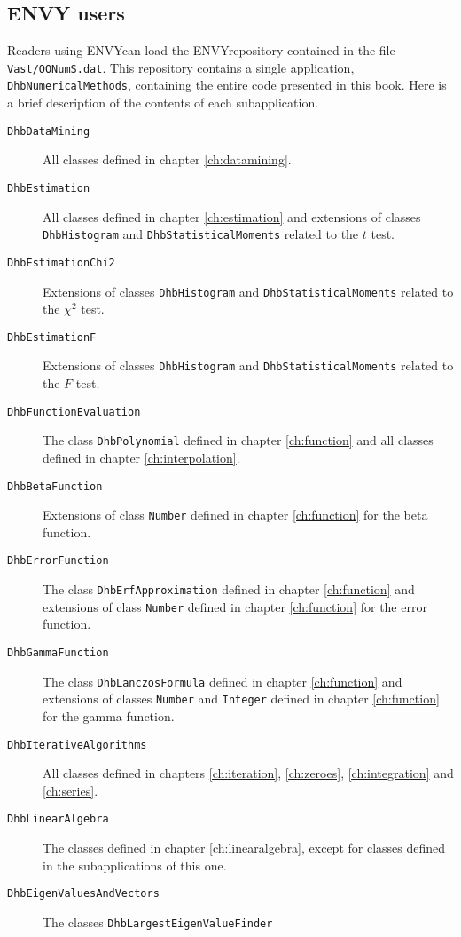 \documentclass[twoside]{book}
\begin{document}
\subsection{ENVY users}
Readers using ENVY\tm can load the ENVY\tm repository contained in
the file {\tt Vast/OONumS.dat}. This repository contains a single
application, {\tt DhbNumericalMethods}, containing the entire code
presented in this book. Here is a brief description of the
contents of each subapplication.
\begin{description}
  \item[\tt DhbDataMining] All classes defined in chapter \ref{ch:datamining}.
  \item[\tt DhbEstimation] All classes defined in chapter \ref{ch:estimation} and
     extensions of classes {\tt DhbHistogram} and
     {\tt DhbStatisticalMoments} related to the $t$ test.
  \item[\tt DhbEstimationChi2] Extensions of classes {\tt DhbHistogram} and
     {\tt DhbStatisticalMoments} related to the $\chi^2$ test.
  \item[\tt DhbEstimationF] Extensions of classes {\tt DhbHistogram} and
     {\tt DhbStatisticalMoments} related to the $F$ test.
  \item[\tt DhbFunctionEvaluation] The class {\tt DhbPolynomial} defined
     in chapter \ref{ch:function} and all classes defined in chapter \ref{ch:interpolation}.
  \item[\tt DhbBetaFunction] Extensions of class {\tt Number} defined
     in chapter \ref{ch:function} for the beta function.
  \item[\tt DhbErrorFunction] The class {\tt DhbErfApproximation} defined
     in chapter \ref{ch:function} and extensions of class {\tt Number} defined
     in chapter \ref{ch:function} for the error function.
  \item[\tt DhbGammaFunction] The class {\tt DhbLanczosFormula} defined
     in chapter \ref{ch:function} and extensions of classes {\tt Number} and {\tt Integer} defined
     in chapter \ref{ch:function} for the gamma function.
  \item[\tt DhbIterativeAlgorithms] All classes defined in chapters \ref{ch:iteration},
     \ref{ch:zeroes}, \ref{ch:integration} and \ref{ch:series}.
  \item[\tt DhbLinearAlgebra] The classes defined in chapter \ref{ch:linearalgebra},
   except for classes defined in the subapplications of this one.
  \item[\tt DhbEigenValuesAndVectors] The classes {\tt DhbLargestEigenValueFinder}

\end{description}
\end{document}
